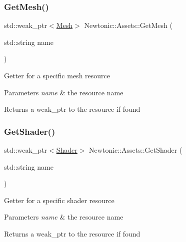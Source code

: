 \subsubsection{\texorpdfstring{GetMesh()}{GetMesh()}}
{\footnotesize\ttfamily std\+::weak\+\_\+ptr$<$\mbox{\hyperlink{classNewtonic_1_1Mesh}{Mesh}}$>$ Newtonic\+::\+Assets\+::\+Get\+Mesh (\begin{DoxyParamCaption}\item[{std\+::string}]{name }\end{DoxyParamCaption})\hspace{0.3cm}{\ttfamily [inline]}}

Getter for a specific mesh resource 
\begin{DoxyParams}{Parameters}
{\em name} & the resource name \\
\hline
\end{DoxyParams}
\begin{DoxyReturn}{Returns}
a weak\+\_\+ptr to the resource if found 
\end{DoxyReturn}
\mbox{\label{classNewtonic_1_1Assets_a475082f857a1da2ae5e58773f19701e0}} 
\subsubsection{\texorpdfstring{GetShader()}{GetShader()}}
{\footnotesize\ttfamily std\+::weak\+\_\+ptr$<$\mbox{\hyperlink{classNewtonic_1_1Shader}{Shader}}$>$ Newtonic\+::\+Assets\+::\+Get\+Shader (\begin{DoxyParamCaption}\item[{std\+::string}]{name }\end{DoxyParamCaption})\hspace{0.3cm}{\ttfamily [inline]}}

Getter for a specific shader resource 
\begin{DoxyParams}{Parameters}
{\em name} & the resource name \\
\hline
\end{DoxyParams}
\begin{DoxyReturn}{Returns}
a weak\+\_\+ptr to the resource if found 
\end{DoxyReturn}
\mbox{\label{classNewtonic_1_1Assets_a5dddfcf54565dd99d9df4f7421d29769}} 
